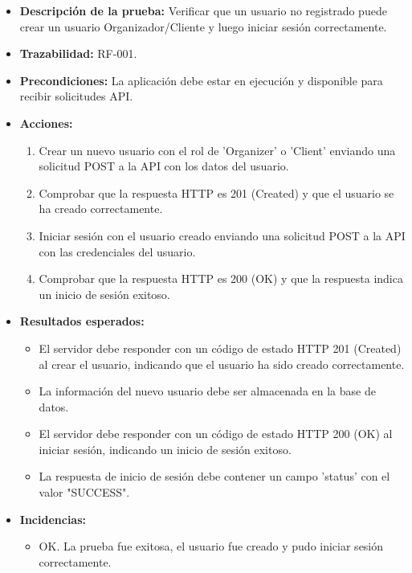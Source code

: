 \begin{itemize}
    \item \textbf{Descripción de la prueba:} Verificar que un usuario no registrado puede crear un usuario Organizador/Cliente y luego iniciar sesión correctamente.
    \item \textbf{Trazabilidad:} RF-001.
    \item \textbf{Precondiciones:} La aplicación debe estar en ejecución y disponible para recibir solicitudes API.
    \item \textbf{Acciones:}
    \begin{enumerate}
        \item Crear un nuevo usuario con el rol de 'Organizer' o 'Client' enviando una solicitud POST a la API con los datos del usuario.
        \item Comprobar que la respuesta HTTP es 201 (Created) y que el usuario se ha creado correctamente.
        \item Iniciar sesión con el usuario creado enviando una solicitud POST a la API con las credenciales del usuario.
        \item Comprobar que la respuesta HTTP es 200 (OK) y que la respuesta indica un inicio de sesión exitoso.
    \end{enumerate}
    \item \textbf{Resultados esperados:}
    \begin{itemize}
        \item El servidor debe responder con un código de estado HTTP 201 (Created) al crear el usuario, indicando que el usuario ha sido creado correctamente.
        \item La información del nuevo usuario debe ser almacenada en la base de datos.
        \item El servidor debe responder con un código de estado HTTP 200 (OK) al iniciar sesión, indicando un inicio de sesión exitoso.
        \item La respuesta de inicio de sesión debe contener un campo 'status' con el valor "SUCCESS".
    \end{itemize}
    \item \textbf{Incidencias:}
    \begin{itemize}
        \item OK. La prueba fue exitosa, el usuario fue creado y pudo iniciar sesión correctamente.
    \end{itemize}
\end{itemize}

